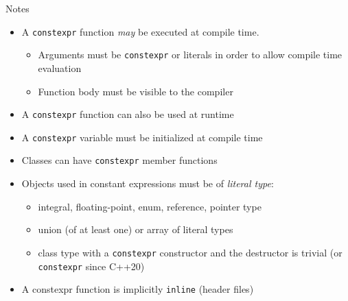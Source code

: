 \begin{frame}[fragile]
  \begin{block}{Notes}
    \begin{itemize}
    \item A \texttt{constexpr} function \emph{may} be executed at compile time.
    \begin{itemize}
      \item Arguments must be \texttt{constexpr} or literals in order to allow compile time evaluation
      \item Function body must be visible to the compiler
    \end{itemize}
    \item A \texttt{constexpr} function can also be used at runtime
    \item A \texttt{constexpr} variable must be initialized at compile time
    \item Classes can have \texttt{constexpr} member functions
    \item Objects used in constant expressions must be of \emph{literal type}:
      \begin{itemize}
      \item integral, floating-point, enum, reference, pointer type
      \item union (of at least one) or array of literal types
      \item class type with a \texttt{constexpr} constructor and
            the destructor is trivial (or \texttt{constexpr} since C++20)
      \end{itemize}
    \item A constexpr function is implicitly \texttt{inline} (header files)
    \end{itemize}
  \end{block}
\end{frame}

